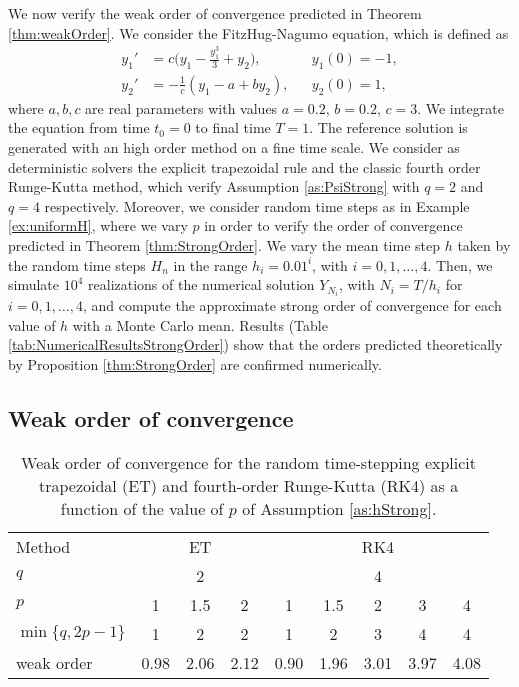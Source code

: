 \documentclass{siamart1116}
\numberwithin{theorem}{section}
\begin{document}
We now verify the weak order of convergence predicted in Theorem \ref{thm:weakOrder}. We consider the FitzHug-Nagumo equation, which is defined as
\begin{equation}\label{eq:FitzNag}
\begin{aligned}
y_1' &= c\big(y_1 - \frac{y_1^3}{3} + y_2\big), && y_1(0) = -1, \\
y_2' &= -\frac{1}{c}(y_1 - a + by_2), && y_2(0) = 1,
\end{aligned}
\end{equation}
where $a, b, c$ are real parameters with values $a = 0.2$, $b = 0.2$, $c = 3$. We integrate the equation from time $t_0 = 0$ to final time $T = 1$. The reference solution is generated with an high order method on a fine time scale. We consider as deterministic solvers the explicit trapezoidal rule and the classic fourth order Runge-Kutta method, which verify Assumption \ref{as:PsiStrong} with $q = 2$ and $q = 4$ respectively. Moreover, we consider random time steps as in Example \ref{ex:uniformH}, where we vary $p$ in order to verify the order of convergence predicted in Theorem \ref{thm:StrongOrder}. We vary the mean time step $h$ taken by the random time steps $H_n$ in the range $h_i = 0.01^{i}$, with $i = 0, 1, \ldots, 4$. Then, we simulate $10^4$ realizations of the numerical solution $Y_{N_i}$, with $N_i = T / h_i$ for $i = 0, 1, \ldots, 4$, and compute the approximate strong order of convergence for each value of $h$ with a Monte Carlo mean. Results (Table \ref{tab:NumericalResultsStrongOrder}) show that the orders predicted theoretically by Proposition \ref{thm:StrongOrder} are confirmed numerically. 

\subsection{Weak order of convergence}

\begin{table}[t]
	\centering
	\begin{tabular}{lcccccccc}
		\toprule
		Method & \multicolumn{3}{c}{ET} & \multicolumn{5}{c}{RK4} \\ 
		\cmidrule(l{2pt}r{2pt}){2-4} \cmidrule(l{2pt}r{2pt}){5-9} 
		$q$ & \multicolumn{3}{c}{2} & \multicolumn{5}{c}{4} \\
		$p$ & 1 & 1.5 & 2 & 1 & 1.5 & 2 & 3 & 4\\
		$\min\{q, 2p - 1\}$ & 1 & 2 & 2 & 1 & 2 & 3 & 4 & 4 \\
		weak order & 0.98 & 2.06 & 2.12 & 0.90 & 1.96 & 3.01 & 3.97 & 4.08 \\
		\bottomrule
	\end{tabular}
	\caption{Weak order of convergence for the random time-stepping explicit trapezoidal (ET) and fourth-order Runge-Kutta (RK4) as a function of the value of $p$ of Assumption \ref{as:hStrong}.}
	\label{tab:NumericalResultsWeakOrder}
\end{table}
\end{document}
